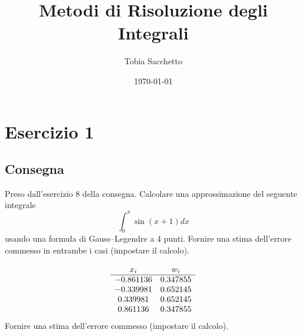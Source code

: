 \documentclass[11pt]{article}
\begin{document}
\title{Metodi di Risoluzione degli Integrali}

\author{Tobia Sacchetto}
\date{\today}
\maketitle

\section{Esercizio 1}
\subsection{Consegna}
Preso dall'esercizio 8 della consegna. Calcolare una approssimazione del seguente integrale
\[
\int_0^\pi{\sin(x+1) dx}
\]
usando una formula di Gauss–Legendre a 4 punti. Fornire una stima dell’errore commesso in entrambe i casi (impostare il calcolo).

\[       
\begin{array}{ c c }
	x_i 	&	w_i		\\
	\hline
 -0.861136	&	0.347855 	\\
 -0.339981	&	0.652145 	\\  
  0.339981	&	0.652145  	\\
  0.861136	&	0.347855 	\\
\end{array}
\]
Fornire una stima dell’errore commesso (impostare il calcolo).
\end{document}
